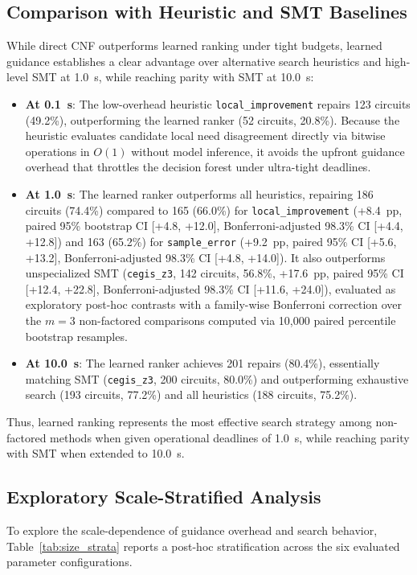\documentclass[11pt,a4paper]{article}
\begin{document}
\subsection{Comparison with Heuristic and SMT Baselines}
While direct CNF outperforms learned ranking under tight budgets, learned guidance establishes a clear advantage over alternative search heuristics and high-level SMT at 1.0~s, while reaching parity with SMT at 10.0~s:
\begin{itemize}
    \item \textbf{At 0.1~s}: The low-overhead heuristic \texttt{local\_improvement} repairs 123 circuits (49.2\%), outperforming the learned ranker (52 circuits, 20.8\%). Because the heuristic evaluates candidate local need disagreement directly via bitwise operations in $O(1)$ without model inference, it avoids the upfront guidance overhead that throttles the decision forest under ultra-tight deadlines.
    \item \textbf{At 1.0~s}: The learned ranker outperforms all heuristics, repairing 186 circuits (74.4\%) compared to 165 (66.0\%) for \texttt{local\_improvement} (+8.4~pp, paired 95\% bootstrap CI [+4.8, +12.0], Bonferroni-adjusted 98.3\% CI [+4.4, +12.8]) and 163 (65.2\%) for \texttt{sample\_error} (+9.2~pp, paired 95\% CI [+5.6, +13.2], Bonferroni-adjusted 98.3\% CI [+4.8, +14.0]). It also outperforms unspecialized SMT (\texttt{cegis\_z3}, 142 circuits, 56.8\%, +17.6~pp, paired 95\% CI [+12.4, +22.8], Bonferroni-adjusted 98.3\% CI [+11.6, +24.0]), evaluated as exploratory post-hoc contrasts with a family-wise Bonferroni correction over the $m=3$ non-factored comparisons computed via 10,000 paired percentile bootstrap resamples.
    \item \textbf{At 10.0~s}: The learned ranker achieves 201 repairs (80.4\%), essentially matching SMT (\texttt{cegis\_z3}, 200 circuits, 80.0\%) and outperforming exhaustive search (193 circuits, 77.2\%) and all heuristics (188 circuits, 75.2\%).
\end{itemize}
Thus, learned ranking represents the most effective search strategy among non-factored methods when given operational deadlines of 1.0~s, while reaching parity with SMT when extended to 10.0~s.

\subsection{Exploratory Scale-Stratified Analysis}
To explore the scale-dependence of guidance overhead and search behavior, Table~\ref{tab:size_strata} reports a post-hoc stratification across the six evaluated parameter configurations.
\end{document}
